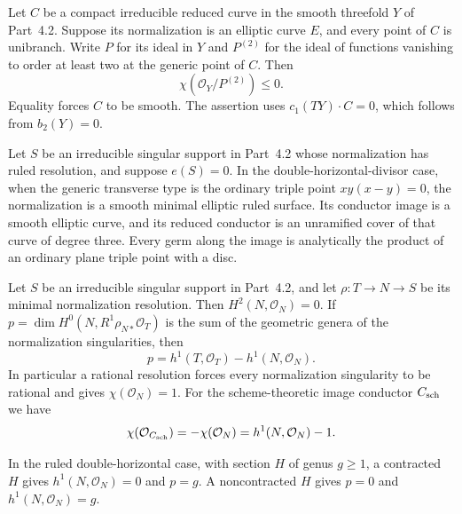 
\begin{proposition}[P4.30]\hypertarget{tag-02X3}{}\label{night:P4.30}\label{stmt:P4.30}


Let $C$ be a compact irreducible reduced curve in the smooth
threefold $Y$ of Part~4.2. Suppose its normalization is an elliptic
curve $E$, and every point of $C$ is unibranch. Write $P$ for its
ideal in $Y$ and $P^{(2)}$ for the ideal of functions vanishing to
order at least two at the generic point of $C$. Then
\[
 \chi(\mathcal O_Y/P^{(2)})\le0.
\]
Equality forces $C$ to be smooth. The assertion uses
$c_1(TY)\cdot C=0$, which follows from $b_2(Y)=0$.
\end{proposition}

\begin{proposition}[P4.31]\hypertarget{tag-02X4}{}\label{night:P4.31}\label{stmt:P4.31}


Let $S$ be an irreducible singular support in Part~4.2 whose
normalization has ruled resolution, and suppose $e(S)=0$.
In the double-horizontal-divisor case, when the generic
transverse type is the ordinary triple point $xy(x-y)=0$,
the normalization is a smooth minimal elliptic ruled surface.
Its conductor image is a smooth elliptic curve, and its
reduced conductor is an unramified cover of that curve of
degree three. Every germ along the image is analytically
the product of an ordinary plane triple point with a disc.
\end{proposition}

\begin{proposition}[P4.33]\hypertarget{tag-02X6}{}\label{night:P4.33}\label{stmt:P4.33}


Let $S$ be an irreducible singular support in Part~4.2, and let
$\rho:T\to N\to S$ be its minimal normalization resolution.
Then $H^2(N,\mathcal O_N)=0$. If
$p=\dim H^0(N,R^1\rho_{N*}\mathcal O_T)$ is the sum of the
geometric genera of the normalization singularities, then
\[
 p=h^1(T,\mathcal O_T)-h^1(N,\mathcal O_N).
\]
In particular a rational resolution forces every normalization
singularity to be rational and gives $\chi(\mathcal O_N)=1$.
For the scheme-theoretic image conductor $C_{\rm sch}$ we have
\[
 \chi(\mathcal O_{C_{\rm sch}})
   =-\chi(\mathcal O_N)=h^1(N,\mathcal O_N)-1.
\]

In the ruled double-horizontal case, with section $H$ of genus
$g\ge1$, a contracted $H$ gives $h^1(N,\mathcal O_N)=0$ and
$p=g$. A noncontracted $H$ gives $p=0$ and
$h^1(N,\mathcal O_N)=g$.
\end{proposition}

